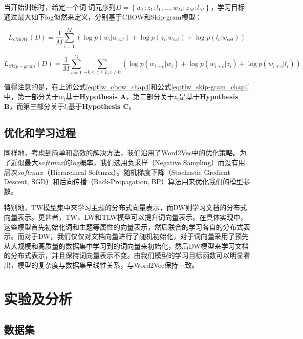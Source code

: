 \documentclass[master]{njuthesis}
\begin{document}
\begin{itemize}
当开始训练时，给定一个词-词元序列$D=\left \{w_{1}:z_{1}:l_{1},...,w_{M}:z_{M}:l_{M}  \right \}$，学习目标通过最大如下log似然来定义，分别基于CBOW和Skip-gram模型：

	\begin{equation}\label{eq:tlw_cbow_chap4}
	{L}_{CBOW}(D)=\frac{1}{M}\sum_{i=1}^{M}(\log p(w_{i}|w_{cxt})+\log p(z_{i}|w_{cxt})+\log p(l_{i}|w_{cxt}))
	\end{equation}
	
	\begin{equation}\label{eq:tlw_skip-gram_chap4}
	{L}_{Skip-gram}(D)=\frac{1}{M}\sum_{i=1}^{M}\sum_{-k\leq c\leq k,c\neq 0}(\log p(w_{i+c}|w_{i})+\log p(w_{i+c}|z_{i})+\log p(w_{i+c}|l_{i}))
	\end{equation}

值得注意的是，在上述公式\ref{eq:tlw_cbow_chap4}和公式\ref{eq:tlw_skip-gram_chap4}中，第一部分关于$w_i$基于\textbf{Hypothesis A}，第二部分关于$z_i$是基于\textbf{Hypothesis B}，而第三部分关于$l_i$基于\textbf{Hypothesis C}。

\end{itemize}

\subsection{优化和学习过程}\label{subsec_optimize_chap4}

同样地，考虑到简单和高效的解决方法，我们沿用了Word2Vec中的优化策略。为了近似最大$softmax$的log概率，我们选用负采样（Negative Sampling）而没有用层次$softmax$（Hierarchical Softmax）\cite{mikolov2013distributed}。随机梯度下降（Stochastic Gredient Descent, SGD）和后向传播（Back-Propagation, BP）算法用来优化我们的模型参数。

特别地，TW模型集中来学习主题的分布式向量表示，而DW则学习文档的分布式向量表示。更甚者，TW、LW和TLW模型可以提升词向量表示。在具体实现中，这些模型首先初始化词和主题等属性的向量表示，然后联合的学习各自的分布式表示。而对于DW，我们仅仅对文档向量进行了随机初始化，对于词向量采用了预先从大规模和高质量的数据集中学习到的词向量来初始化，然后DW模型来学习文档的分布式表示，并且保持词向量表示不变。由我们模型的学习目标函数可以明显看出，模型的复杂度与数据集呈线性关系，与Word2Vec保持一致。

\section{实验及分析}\label{sec_exps_chap4}

\subsection{数据集}\label{subsec_datasets_chap4}
\end{document}
